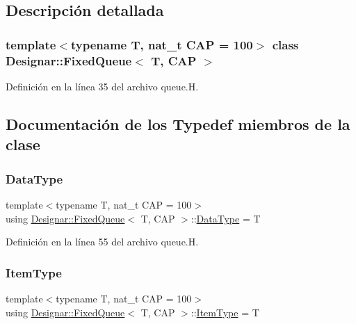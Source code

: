 \subsection{Descripción detallada}
\subsubsection*{template$<$typename T, nat\+\_\+t C\+AP = 100$>$\newline
class Designar\+::\+Fixed\+Queue$<$ T, C\+A\+P $>$}



Definición en la línea 35 del archivo queue.\+H.



\subsection{Documentación de los \textquotesingle{}Typedef\textquotesingle{} miembros de la clase}
\mbox{\label{class_designar_1_1_fixed_queue_a0638afcff4eb29040d4573212558da5f}} 
\subsubsection{\texorpdfstring{Data\+Type}{DataType}}
{\footnotesize\ttfamily template$<$typename T, nat\+\_\+t C\+AP = 100$>$ \\
using \hyperlink{class_designar_1_1_fixed_queue}{Designar\+::\+Fixed\+Queue}$<$ T, C\+AP $>$\+::\hyperlink{class_designar_1_1_fixed_queue_a0638afcff4eb29040d4573212558da5f}{Data\+Type} =  T}



Definición en la línea 55 del archivo queue.\+H.

\mbox{\label{class_designar_1_1_fixed_queue_aa1c356bc74a041121662af027abf279b}} 
\subsubsection{\texorpdfstring{Item\+Type}{ItemType}}
{\footnotesize\ttfamily template$<$typename T, nat\+\_\+t C\+AP = 100$>$ \\
using \hyperlink{class_designar_1_1_fixed_queue}{Designar\+::\+Fixed\+Queue}$<$ T, C\+AP $>$\+::\hyperlink{class_designar_1_1_fixed_queue_aa1c356bc74a041121662af027abf279b}{Item\+Type} =  T}



